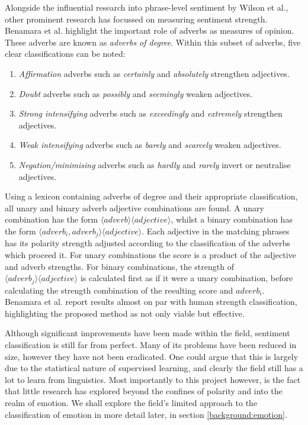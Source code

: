 Alongside the influential research into phrase-level sentiment by Wilson et al., other prominent research has focussed on measuring sentiment strength. Benamara et al. \cite{Benamara:2007wz} highlight the important role of adverbs as measures of opinion. These adverbs are known as \emph{adverbs of degree}. Within this subset of adverbs, five clear classifications can be noted:

\begin{enumerate}
	\item \emph{Affirmation} adverbs such as \emph{certainly} and \emph{absolutely} strengthen adjectives.
	\item \emph{Doubt} adverbs such as \emph{possibly} and \emph{seemingly} weaken adjectives.
	\item \emph{Strong intensifying} adverbs such as \emph{exceedingly} and \emph{extremely} strengthen adjectives.
	\item \emph{Weak intensifying} adverbs such as \emph{barely} and \emph{scarcely} weaken adjectives.
	\item \emph{Negation/minimising} adverbs such as \emph{hardly} and \emph{rarely} invert or neutralise adjectives.
\end{enumerate}

Using a lexicon containing adverbs of degree and their appropriate classification, all unary and binary adverb adjective combinations are found. A unary combination has the form $\langle adverb \rangle\langle adjective \rangle$, whilst a binary combination has the form $\langle adverb_i, adverb_j \rangle\langle adjective \rangle$. Each adjective in the matching phrases has its polarity strength adjusted according to the classification of the adverbs which proceed it. For unary combinations the score is a product of the adjective and adverb strengths. For binary combinations, the strength of $\langle adverb_j \rangle\langle adjective \rangle$ is calculated first as if it were a unary combination, before calculating the strength combination of the resulting score and $adverb_i$. Benamara et al. report results almost on par with human strength classification, highlighting the proposed method as not only viable but effective.

Although significant improvements have been made within the field, sentiment classification is still far from perfect. Many of its problems have been reduced in size, however they have not been eradicated. One could argue that this is largely due to the statistical nature of supervised learning, and clearly the field still has a lot to learn from linguistics. Most importantly to this project however, is the fact that little research has explored beyond the confines of polarity and into the realm of emotion. We shall explore the field's limited approach to the classification of emotion in more detail later, in section \ref{background:emotion}.

